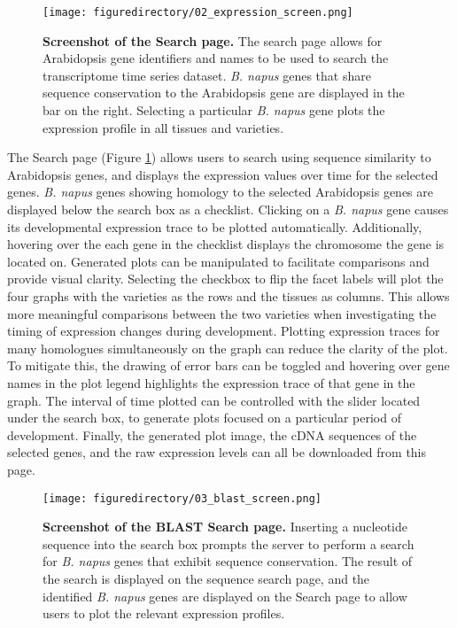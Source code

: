 \documentclass[12pt,]{book}
\begin{document}
\begin{figure}[htbp]
\centering
\texttt{[image: figuredirectory/02\_expression\_screen.png]}
\caption{\textbf{Screenshot of the Search page.} The search page allows
for Arabidopsis gene identifiers and names to be used to search the
transcriptome time series dataset. \emph{B. napus} genes that share
sequence conservation to the Arabidopsis gene are displayed in the bar
on the right. Selecting a particular \emph{B. napus} gene plots the
expression profile in all tissues and
varieties.}\label{figure:website:search}
\end{figure}

The Search page (Figure \ref{figure:website:search}) allows users to
search using sequence similarity to Arabidopsis genes, and displays the
expression values over time for the selected genes. \emph{B. napus}
genes showing homology to the selected Arabidopsis genes are displayed
below the search box as a checklist. Clicking on a \emph{B. napus} gene
causes its developmental expression trace to be plotted automatically.
Additionally, hovering over the each gene in the checklist displays the
chromosome the gene is located on. Generated plots can be manipulated to
facilitate comparisons and provide visual clarity. Selecting the
checkbox to flip the facet labels will plot the four graphs with the
varieties as the rows and the tissues as columns. This allows more
meaningful comparisons between the two varieties when investigating the
timing of expression changes during development. Plotting expression
traces for many homologues simultaneously on the graph can reduce the
clarity of the plot. To mitigate this, the drawing of error bars can be
toggled and hovering over gene names in the plot legend highlights the
expression trace of that gene in the graph. The interval of time plotted
can be controlled with the slider located under the search box, to
generate plots focused on a particular period of development. Finally,
the generated plot image, the cDNA sequences of the selected genes, and
the raw expression levels can all be downloaded from this page.

\begin{figure}[htbp]
\centering
\texttt{[image: figuredirectory/03\_blast\_screen.png]}
\caption{\textbf{Screenshot of the BLAST Search page.} Inserting a
nucleotide sequence into the search box prompts the server to perform a
search for \emph{B. napus} genes that exhibit sequence conservation. The
result of the search is displayed on the sequence search page, and the
identified \emph{B. napus} genes are displayed on the Search page to
allow users to plot the relevant expression
profiles.}\label{figure:website:blast}
\end{figure}
\end{document}
